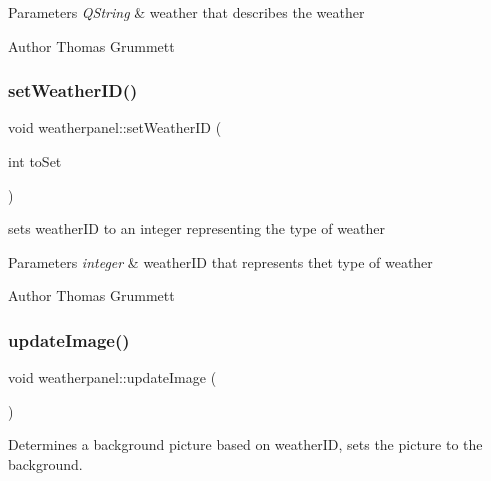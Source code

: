 \begin{DoxyParams}{Parameters}
{\em Q\+String} & weather that describes the weather \\
\hline
\end{DoxyParams}
\begin{DoxyAuthor}{Author}
Thomas Grummett 
\end{DoxyAuthor}
\mbox{\label{classweatherpanel_adcfb5683fa421ee6b45b775ca3b6c5ae}} 
\subsubsection{\texorpdfstring{set\+Weather\+I\+D()}{setWeatherID()}}
{\footnotesize\ttfamily void weatherpanel\+::set\+Weather\+ID (\begin{DoxyParamCaption}\item[{int}]{to\+Set }\end{DoxyParamCaption})}



sets weather\+ID to an integer representing the type of weather 


\begin{DoxyParams}{Parameters}
{\em integer} & weather\+ID that represents thet type of weather \\
\hline
\end{DoxyParams}
\begin{DoxyAuthor}{Author}
Thomas Grummett 
\end{DoxyAuthor}
\mbox{\label{classweatherpanel_a56353d725e339accc2952eda96d65907}} 
\subsubsection{\texorpdfstring{update\+Image()}{updateImage()}}
{\footnotesize\ttfamily void weatherpanel\+::update\+Image (\begin{DoxyParamCaption}{ }\end{DoxyParamCaption})\hspace{0.3cm}{\ttfamily [private]}}



Determines a background picture based on weather\+ID, sets the picture to the background. 

